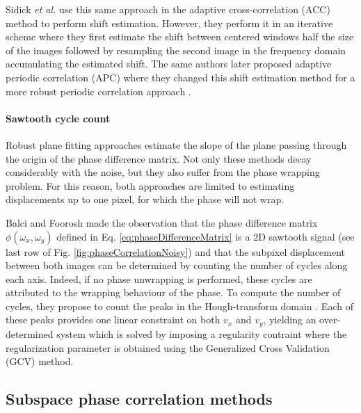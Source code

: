 Sidick \emph{et al.} \cite{Sidick2007Adaptive} use this same approach in the adaptive cross-correlation (ACC) method to perform shift estimation. However, they perform it in an iterative scheme where they first estimate the shift between centered windows half the size of the images followed by resampling the second image in the frequency domain accumulating the estimated shift. The same authors later proposed adaptive periodic correlation (APC) \cite{Sidick2011} where they changed this shift estimation method for a more robust periodic correlation approach \cite{Poyneer2005}.

\paragraph{Sawtooth cycle count}
Robust plane fitting approaches estimate the slope of the plane passing through the origin of the phase difference matrix. Not only these methods decay considerably with the noise, but they also suffer from the phase wrapping problem\cite{ghiglia1998two}. For this reason, both approaches are limited to estimating displacements up to one pixel, for which the phase will not wrap.

Balci and Foorosh \cite{Balci_2005} made the observation that the phase difference matrix $\phi(\omega_x,\omega_y)$ defined in Eq. \eqref{eq:phaseDifferenceMatrix} is a 2D sawtooth signal (see last row of Fig. \ref{fig:phaseCorrelationNoisy}) and that the subpixel displacement between both images can be determined by counting the number of cycles along each axis. Indeed, if no phase unwrapping is performed, these cycles are attributed to the wrapping behaviour of the phase. To compute the number of cycles, they propose to count the peaks in the Hough-transform domain \cite{hough1962method}. Each of these peaks provides one linear constraint on both $v_x$ and $v_y$, yielding an over-determined system which is solved by imposing a regularity contraint where the regularization parameter is obtained using the Generalized Cross Validation (GCV) method.


\subsection{Subspace phase correlation methods}

